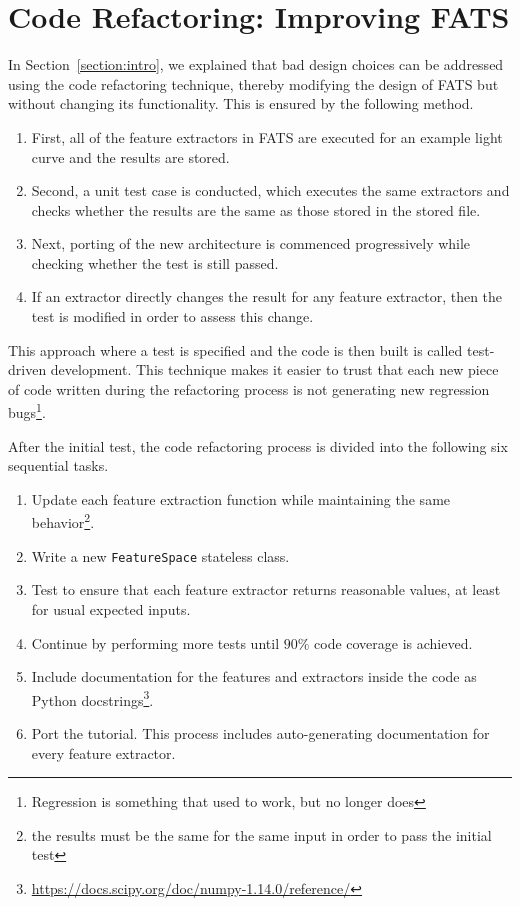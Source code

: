 \documentclass[final,5p,times,twocolumn,authoryear]{elsarticle}
\begin{document}
\section{Code Refactoring: Improving FATS }
\label{section:reengineering}
%
In Section~\ref{section:intro}, we explained that bad 
design choices can be addressed using the code refactoring technique, thereby
modifying the design of FATS but without changing its functionality.
This is ensured by the following method.
%
\begin{enumerate}
\item First, all of the feature extractors in FATS 
	are executed for an example light curve and the results are stored.
\item Second, a unit test case is conducted, which executes the same extractors and checks
	whether the results are the same as those stored in the stored file.
\item Next, porting of the new architecture is commenced progressively while 
	checking whether the test is still passed.
\item If an extractor directly changes the result 
	for any feature extractor, then the test is modified in order to assess this change.
\end{enumerate}
%
This approach where a test is specified and the code is then built is 
called test-driven development. 
%
This technique makes it easier to trust that each new piece of code written 
during the refactoring process is not generating new regression bugs\footnote{Regression is something that used to work, but no longer does}.

After the initial test, the code refactoring process is divided into the following six
sequential tasks.
%
\begin{enumerate}
\item Update each feature extraction function while 
	maintaining the same behavior\footnote{the results 
    must be the same for the same input in order to pass the 
    initial test}.
\item Write a new \texttt{FeatureSpace} stateless class. 
\item Test to ensure that each feature extractor returns reasonable values, at
	least for usual expected inputs.
\item Continue by performing more tests until $90\%$ code coverage is achieved.
\item Include documentation for the features and extractors 
	inside the code as Python 
    docstrings\footnote{\url{https://docs.scipy.org/doc/numpy-1.14.0/reference/}}.
\item Port the tutorial. This process includes auto-generating
	documentation for every feature extractor.
\end{enumerate}
\end{document}
